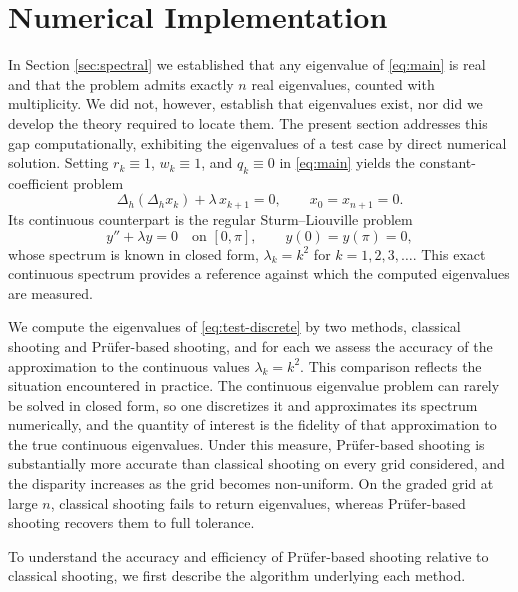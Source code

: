 \documentclass[12pt,reqno]{amsart}
\numberwithin{equation}{section}
\begin{document}
\section{Numerical Implementation}
\label{sec:numerical}

In Section \ref{sec:spectral} we established that any eigenvalue of \eqref{eq:main} is real and that the problem admits exactly $n$ real eigenvalues, counted with multiplicity. We did not, however, establish that eigenvalues exist, nor did we develop the theory required to locate them. The present section addresses this gap computationally, exhibiting the eigenvalues of a test case by direct numerical solution. Setting $r_k \equiv 1$, $w_k \equiv 1$, and $q_k \equiv 0$ in \eqref{eq:main} yields the constant-coefficient problem
\begin{equation}
\label{eq:test-discrete}
\Delta_h(\Delta_h x_k) + \lambda\, x_{k+1} = 0, \qquad x_0 = x_{n+1} = 0.
\end{equation}
Its continuous counterpart is the regular Sturm--Liouville problem \begin{equation}
\label{eq:test-continuous}
y'' + \lambda y = 0 \quad \text{on } [0,\pi], \qquad y(0) = y(\pi) = 0,
\end{equation}
whose spectrum is known in closed form, $\lambda_k = k^2$ for $k = 1, 2, 3, \ldots$. This exact continuous spectrum provides a reference against which the computed eigenvalues are measured.

We compute the eigenvalues of \eqref{eq:test-discrete} by two methods, classical shooting and Pr\"ufer-based shooting, and for each we assess the accuracy of the approximation to the continuous values $\lambda_k = k^2$. This comparison reflects the situation encountered in practice. The continuous eigenvalue problem can rarely be solved in closed form, so one discretizes it and approximates its spectrum numerically, and the quantity of interest is the fidelity of that approximation to the true continuous eigenvalues. Under this measure, Pr\"ufer-based shooting is substantially more accurate than classical shooting on every grid considered, and the disparity increases as the grid becomes non-uniform. On the graded grid at large $n$, classical shooting fails to return eigenvalues, whereas Pr\"ufer-based shooting recovers them to full tolerance.

To understand the accuracy and efficiency of Prüfer-based shooting relative to classical shooting, we first describe the algorithm underlying each method.
\end{document}
